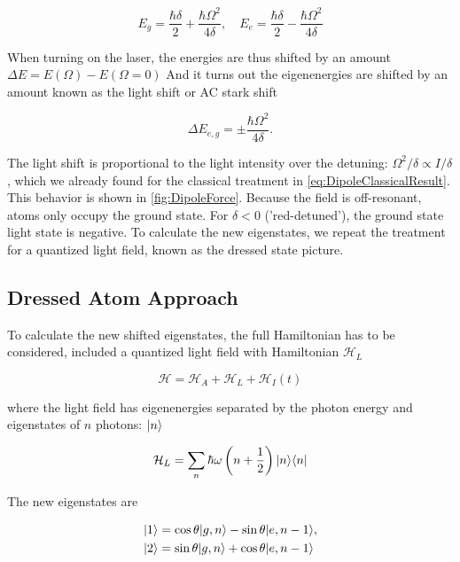 \begin{equation}
	E_g = \frac{\hbar \delta}{2} +\frac{\hbar \Omega^2}{4 \delta}, \quad
	E_e = \frac{\hbar \delta}{2} -\frac{\hbar \Omega^2}{4 \delta}
\end{equation}

When turning on the laser, the energies are thus shifted by an amount $\Delta E = E(\Omega)-E(\Omega=0)$ And it turns out the eigenenergies are shifted by an amount known as the light shift or AC stark shift \cite{Vredenbregt2020}

\begin{equation}\label{eq:Stark}
	\Delta E_{e,g} = \pm \frac{\hbar \Omega^2}{4 \delta}.
\end{equation}

The light shift is proportional to the light intensity over the detuning: $\Omega^2 / \delta \propto I / \delta$, which we already found for the classical treatment in \cref{eq:DipoleClassicalResult}. This behavior is shown in \cref{fig:DipoleForce}. Because the field is off-resonant, atoms only occupy the ground state. For $\delta <0$ ('red-detuned'), the ground state light state is negative. To calculate the new eigenstates, we repeat the treatment for a quantized light field, known as the dressed state picture.

\subsection{Dressed Atom Approach}

To calculate the new shifted eigenstates, the full Hamiltonian has to be considered, included a quantized light field with Hamiltonian $\mathcal{H}_L$ \cite{Dalibard1985}

\begin{equation}
	\mathcal{H} = \mathcal{H}_A + \mathcal{H}_L + \mathcal{H}_I(t)
\end{equation}

where the light field has eigenenergies separated by the photon energy and eigenstates of $n$ photons: $\lvert n\rangle$ \cite{Vredenbregt2020}

\begin{equation}
	\mathcal{H}_L = \sum_n \hbar \omega \left(n+\frac{1}{2}\right) \lvert n\rangle\langle n\rvert
\end{equation}

The new eigenstates are 

\begin{equation}
	\begin{split}
		\lvert1\rangle &= \cos{\theta} \lvert g,n\rangle - \sin{\theta} \lvert e,n-1\rangle,\\
		\lvert2\rangle &= \sin{\theta} \lvert g,n\rangle + \cos{\theta} \lvert e,n-1\rangle
	\end{split}
\end{equation}

